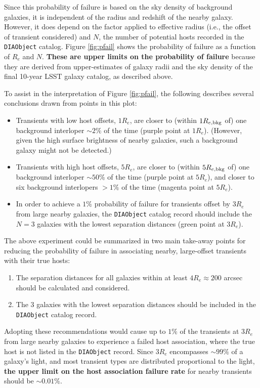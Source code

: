Since this probability of failure is based on the sky density of background galaxies, it is independent of the radius and redshift of the nearby galaxy. 
However, it does depend on the factor applied to effective radius (i.e., the offset of transient considered) and $N$, the number of potential hosts recorded in the {\tt DIAObject} catalog.
Figure \ref{fig:pfail} shows the probability of failure as a function of $R_e$ and $N$.
\textbf{These are upper limits on the probability of failure} because they are derived from upper-estimates of galaxy radii and the sky density of the final 10-year LSST galaxy catalog, as described above. 

To assist in the interpretation of Figure \ref{fig:pfail}, the following describes several conclusions drawn from points in this plot:
\begin{itemize}
\item Transients with low host offsets, $1R_e$, are closer to (within $1R_{e,{\rm bkg}}$ of) one background interloper $\sim2\%$ of the time (purple point at $1R_e$). (However, given the high surface brightness of nearby galaxies, such a background galaxy might not be detected.)
\item Transients with high host offsets, $5R_e$, are closer to (within $5R_{e,{\rm bkg}}$ of) one background interloper $\sim50\%$ of the time (purple point at $5R_e$), and closer to six background interlopers $>1\%$ of the time (magenta point at $5R_e$).
\item In order to achieve a $1\%$ probability of failure for transients offset by $3R_e$ from large nearby galaxies, the {\tt DIAObject} catalog record should include the $N=3$ galaxies with the lowest separation distances (green point at $3R_e$).
\end{itemize} 

The above experiment could be summarized in two main take-away points for reducing the probability of failure in associating nearby, large-offset transients with their true hosts:
\begin{enumerate}
\item The separation distances for all galaxies within at least $4R_e \approx 200$ arcsec should be calculated and considered.
\item The 3 galaxies with the lowest separation distances should be included in the {\tt DIAObject} catalog record.
\end{enumerate}
Adopting these recommendations would cause up to $1\%$ of the transients at $3R_e$ from large nearby galaxies to experience a failed host association, where the true host is not listed in the {\tt DIAObject} record.
Since $3R_e$ encompasses $\sim99\%$ of a galaxy's light, and most transient types are distributed proportional to the light, \textbf{the upper limit on the host association failure rate} for nearby transients should be $\sim0.01\%$.

